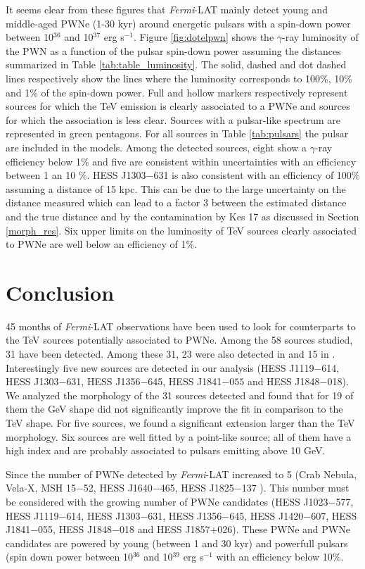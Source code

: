 It seems clear from these figures that \emph{Fermi}-LAT mainly detect young and middle-aged PWNe (1-30 kyr) around energetic pulsars with a spin-down power between 10$^{36}$ and 10$^{37}$ erg s$^{-1}$. Figure \ref{fig:dotelpwn} shows the $\gamma$-ray luminosity of the PWN as a function of the pulsar spin-down power assuming the distances summarized in Table \ref{tab:table_luminosity}. The solid, dashed and dot dashed lines respectively show the lines where the luminosity corresponds to 100\%, 10\% and 1\% of the spin-down power. Full and hollow markers respectively represent sources for which the TeV emission is clearly associated to a PWNe and sources for which the association is less clear. Sources with a pulsar-like spectrum are represented in green pentagons. For all sources in Table \ref{tab:pulsars} the pulsar are included in the models. Among the detected sources, eight show a $\gamma$-ray efficiency below 1\% and five are consistent within uncertainties with  an efficiency between 1 an 10 \%. HESS J1303$-$631 is also consistent with an efficiency of 100\% assuming a distance of 15 kpc. This can be due to the large uncertainty on the distance measured which can lead to a factor 3 between the estimated distance and the true distance and by the contamination by Kes 17 as discussed in Section \ref{morph_res}. Six upper limits on the luminosity of TeV sources clearly associated to PWNe are well below an efficiency of 1\%.

\section{Conclusion}

45 months of \emph{Fermi}-LAT observations have been used to look for counterparts to the TeV sources potentially associated to PWNe. Among the 58 sources studied, 31 have been detected. Among these 31, 23 were also detected in \cite{1FHL} and 15 in \cite{2012PhRvD..85h3008N}. Interestingly five new sources are detected in our analysis (HESS J1119$-$614, HESS J1303$-$631, HESS J1356$-$645, HESS J1841$-055$ and HESS J1848$-$018). We analyzed the morphology of the 31 sources detected and found that for 19 of them the GeV shape did not significantly improve the fit in comparison to the TeV shape. For five sources, we found a significant extension larger than the TeV morphology. Six sources are well fitted by a point-like source; all of them have a high index and are probably associated to pulsars emitting above 10 GeV.

Since \cite{2011ApJ...726...35A} the number of PWNe detected by \emph{Fermi}-LAT increased to 5 (Crab Nebula, Vela-X, MSH 15$-$52, HESS J1640$-$465, HESS J1825$-$137 ). This number must be considered with the growing number of PWNe candidates (HESS J1023$-$577, HESS J1119$-$614, HESS J1303$-$631, HESS J1356$-$645, HESS J1420$-$607, HESS J1841$-$055, HESS J1848$-$018 and HESS J1857+026). These PWNe and PWNe candidates are powered by young (between 1 and 30 kyr) and powerfull pulsars (spin down power between 10$^{36}$ and 10$^{39}$ erg s$^{-1}$ with an efficiency below 10\%.
